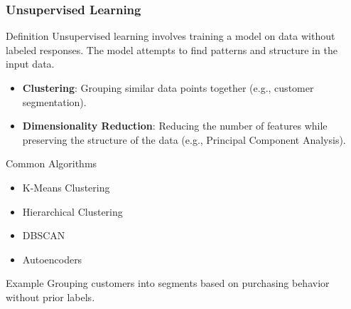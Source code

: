 \documentclass[aspectratio=169]{beamer}
\begin{document}
\begin{frame}[fragile]
    \frametitle{Unsupervised Learning}
    \begin{block}{Definition}
        Unsupervised learning involves training a model on data without labeled responses. The model attempts to find patterns and structure in the input data.
    \end{block}
    \begin{itemize}
        \item \textbf{Clustering}: Grouping similar data points together (e.g., customer segmentation).
        \item \textbf{Dimensionality Reduction}: Reducing the number of features while preserving the structure of the data (e.g., Principal Component Analysis).
    \end{itemize}
    \begin{block}{Common Algorithms}
        \begin{itemize}
            \item K-Means Clustering
            \item Hierarchical Clustering
            \item DBSCAN
            \item Autoencoders
        \end{itemize}
    \end{block}
    \begin{block}{Example}
        Grouping customers into segments based on purchasing behavior without prior labels.
    \end{block}
\end{frame}
\end{document}
